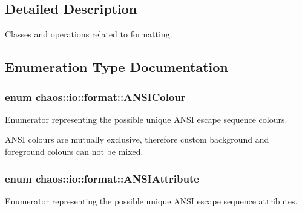 \subsection{Detailed Description}
Classes and operations related to formatting. 

\subsection{Enumeration Type Documentation}
\hypertarget{namespacechaos_1_1io_1_1format_aa30dcff2478ffc94e33504c8886a5b1a}{
\subsubsection[{A\-N\-S\-I\-Colour}]{\setlength{\rightskip}{0pt plus 5cm}enum {\bf chaos\-::io\-::format\-::\-A\-N\-S\-I\-Colour}}}\label{namespacechaos_1_1io_1_1format_aa30dcff2478ffc94e33504c8886a5b1a}


Enumerator representing the possible unique A\-N\-S\-I escape sequence colours. 

A\-N\-S\-I colours are mutually exclusive, therefore custom background and foreground colours can not be mixed. \hypertarget{namespacechaos_1_1io_1_1format_af01119682ec0bc616b49641e0c2a7ccf}{
\subsubsection[{A\-N\-S\-I\-Attribute}]{\setlength{\rightskip}{0pt plus 5cm}enum {\bf chaos\-::io\-::format\-::\-A\-N\-S\-I\-Attribute}}}\label{namespacechaos_1_1io_1_1format_af01119682ec0bc616b49641e0c2a7ccf}


Enumerator representing the possible unique A\-N\-S\-I escape sequence attributes. 


